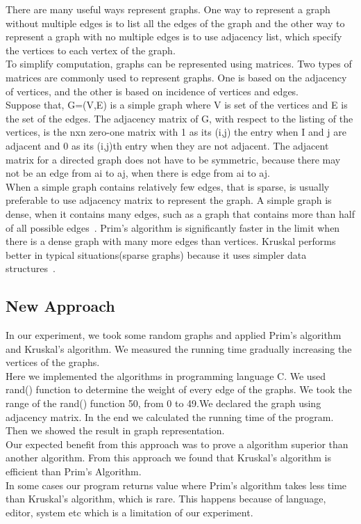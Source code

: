 \documentclass[conference,column]{IEEEtran}
\begin{document}
There are many useful  ways represent graphs. One way to represent a graph without multiple edges is to list all the edges of the graph and the other way to represent a graph with no multiple edges is to use adjacency list, which specify the vertices to each vertex of the graph.\\
To simplify computation, graphs can be represented using matrices. Two types of matrices are commonly used to represent graphs. One is based on the adjacency of vertices, and the other is based on incidence of vertices and edges.\\
Suppose that, G=(V,E) is a simple graph where V is set of the vertices and E is the set of the edges. The adjacency matrix of G, with respect to the listing of the vertices, is the nxn zero-one matrix with 1 as its (i,j) the entry when I and j are adjacent and 0 as its (i,j)th entry when they are not adjacent. The adjacent matrix for a directed graph does not have to be symmetric, because there may not be an edge from ai to aj, when there is edge from ai to aj.\\
When a simple graph contains relatively few edges, that is sparse, is usually preferable to use adjacency matrix to represent the graph. A simple graph is dense, when it contains many edges, such as a graph that contains more than half of all possible edges~\cite{bookdis}. Prim's algorithm is significantly faster in the limit when there is a dense graph with many more edges than vertices. Kruskal performs better in typical situations(sparse graphs) because it uses simpler data structures~\cite{quo}.

\subsection{New Approach}
In our experiment, we took some random graphs and applied Prim's algorithm and Kruskal's algorithm. We measured the running time gradually increasing the vertices of the graphs.\\
Here we implemented the algorithms in programming language C. We used rand() function to determine the weight of every edge of the graphs. We took the range of the rand() function 50, from 0 to 49.We declared the graph using adjacency matrix. In the end we calculated the running time of the program. Then we showed the result in graph representation.\\
Our expected benefit from this approach was to prove a algorithm superior than another algorithm. From this approach we found that Kruskal's algorithm is efficient than Prim's Algorithm.\\
In some cases our program returns value where Prim's algorithm takes less time than Kruskal's algorithm, which is rare. This happens because of language, editor, system etc which is a limitation of our experiment.
\end{document}
